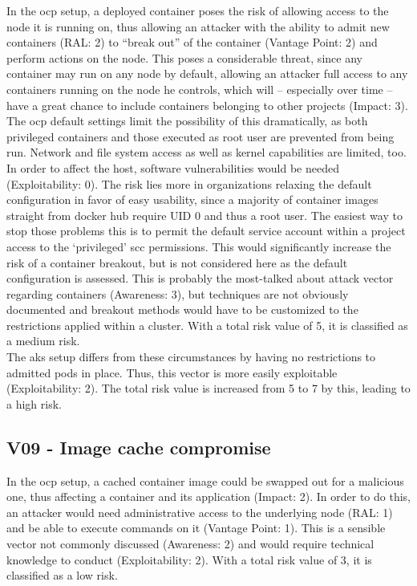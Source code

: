 In the \gls{ocp} setup, a deployed container poses the risk of allowing access to the node it is running on, thus allowing an attacker with the ability to admit new containers (RAL: 2) to “break out” of the container (Vantage Point: 2) and perform actions on the node.
This poses a considerable threat, since any container may run on any node by default, allowing an attacker full access to any containers running on the node he controls, which will – especially over time – have a great chance to include containers belonging to other projects (Impact: 3).
The \gls{ocp} default settings limit the possibility of this dramatically, as both privileged containers and those executed as root user are prevented from being run. Network and file system access as well as kernel capabilities are limited, too. In order to affect the host, software vulnerabilities would be needed (Exploitability: 0).
The risk lies more in organizations relaxing the default configuration in favor of easy usability, since a majority of container images straight from docker hub require UID 0 and thus a root user. The easiest way to stop those problems this is to permit the default service account within a project access to the ‘privileged’ \gls{scc} permissions. This would significantly increase the risk of a container breakout, but is not considered here as the default configuration is assessed.
This is probably the most-talked about attack vector regarding containers (Awareness: 3), but techniques are not obviously documented and breakout methods would have to be customized to the restrictions applied within a cluster.
With a total risk value of 5, it is classified as a medium risk. \\


The \gls{aks} setup differs from these circumstances by having no restrictions to admitted pods in place. Thus, this vector is more easily exploitable (Exploitability: 2).
The total risk value is increased from 5 to 7 by this, leading to a high risk.

\subsection{V09 - Image cache compromise}

In the \gls{ocp} setup, a cached container image could be swapped out for a malicious one, thus affecting a container and its application (Impact: 2). In order to do this, an attacker would need administrative access to the underlying node (RAL: 1) and be able to execute commands on it (Vantage Point: 1). This is a sensible vector not commonly discussed (Awareness: 2) and would require technical knowledge to conduct (Exploitability: 2).
With a total risk value of 3, it is classified as a low risk. \\



